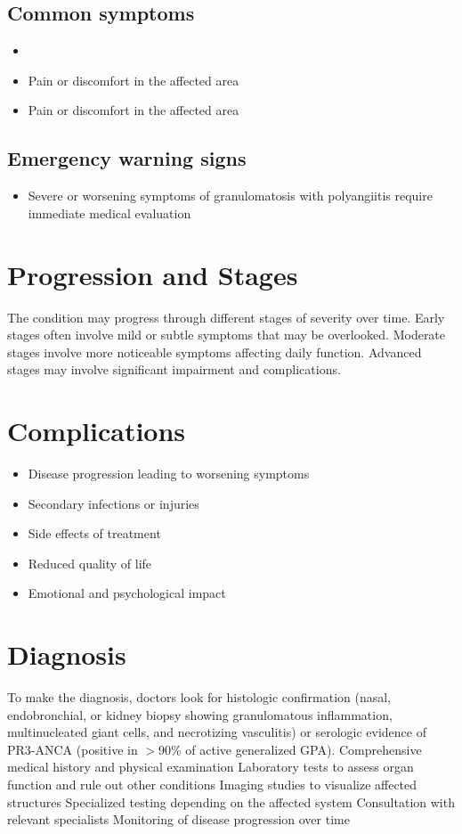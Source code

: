 \subsection{Common symptoms}
\begin{itemize}[noitemsep]
  \item \item Pain or discomfort in the affected area    \item Pain or discomfort in the affected area
  \end{itemize}

\subsection{Emergency warning signs}
\begin{itemize}[noitemsep]
  \item Severe or worsening symptoms of granulomatosis with polyangiitis require immediate medical evaluation
\end{itemize}
\section{Progression and Stages}
The condition may progress through different stages of severity over time. Early stages often involve mild or subtle symptoms that may be overlooked. Moderate stages involve more noticeable symptoms affecting daily function. Advanced stages may involve significant impairment and complications.
\section{Complications}
\begin{itemize}[noitemsep]
  \item Disease progression leading to worsening symptoms
  \item Secondary infections or injuries
  \item Side effects of treatment
  \item Reduced quality of life
  \item Emotional and psychological impact
\end{itemize}
\section{Diagnosis}
To make the diagnosis, doctors look for histologic confirmation (nasal, endobronchial, or kidney biopsy showing granulomatous inflammation, multinucleated giant cells, and necrotizing vasculitis) or serologic evidence of PR3-ANCA (positive in $>$90\% of active generalized GPA). Comprehensive medical history and physical examination Laboratory tests to assess organ function and rule out other conditions Imaging studies to visualize affected structures Specialized testing depending on the affected system Consultation with relevant specialists Monitoring of disease progression over time

